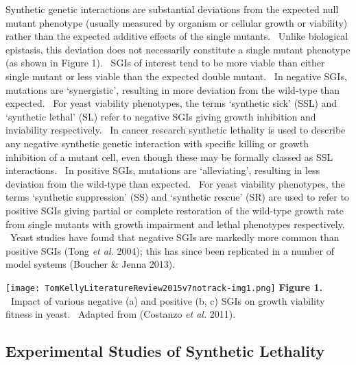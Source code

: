 Synthetic genetic interactions are substantial deviations from the
expected null mutant phenotype (usually measured by organism or
cellular growth or viability) rather than the expected additive effects
of the single mutants. \ Unlike biological epistasis, this deviation
does not necessarily constitute a single mutant phenotype (as shown in
Figure 1). \ SGIs of interest tend to be more viable than either single
mutant or less viable than the expected double mutant. \ In negative
SGIs, mutations are {\textquoteleft}synergistic{\textquoteright},
resulting in more deviation from the wild-type than expected. \ For
yeast viability phenotypes, the terms {\textquoteleft}synthetic
sick{\textquoteright} (SSL) and {\textquoteleft}synthetic
lethal{\textquoteright} (SL) refer to negative SGIs giving growth
inhibition and inviability respectively. \ In cancer research synthetic
lethality is used to describe any negative synthetic genetic
interaction with specific killing or growth inhibition of a mutant
cell, even though these may be formally classed as SSL interactions.
\ In positive SGIs, mutations are
{\textquoteleft}alleviating{\textquoteright}, resulting in less
deviation from the wild-type than expected. \ For yeast viability
phenotypes, the terms {\textquoteleft}synthetic
suppression{\textquoteright} (SS) and {\textquoteleft}synthetic
rescue{\textquoteright} (SR) are used to refer to positive SGIs giving
partial or complete restoration of the wild-type growth rate from
single mutants with growth impairment and lethal phenotypes
respectively. \ Yeast studies have found that negative SGIs are
markedly more common than positive SGIs (Tong\textit{ et al.} 2004);
this has since been replicated in a number of model systems (Boucher \&
Jenna 2013). \ 


\texttt{[image: TomKellyLiteratureReview2015v7notrack-img1.png]}
\textbf{Figure 1. \ }Impact of various negative (a) and positive (b, c)
SGIs on growth viability fitness in yeast. \ Adapted from
(Costanzo\textit{ et al.} 2011). \ 


\subsection[Experimental Studies of Synthetic Lethality]{Experimental
Studies of Synthetic Lethality}

